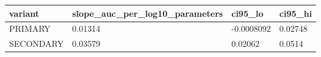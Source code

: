 \begin{tabular}{llll}
\toprule
variant & slope\_auc\_per\_log10\_parameters & ci95\_lo & ci95\_hi \\
\midrule
PRIMARY & 0.01314 & -0.0008092 & 0.02748 \\
SECONDARY & 0.03579 & 0.02062 & 0.0514 \\
\bottomrule
\end{tabular}
